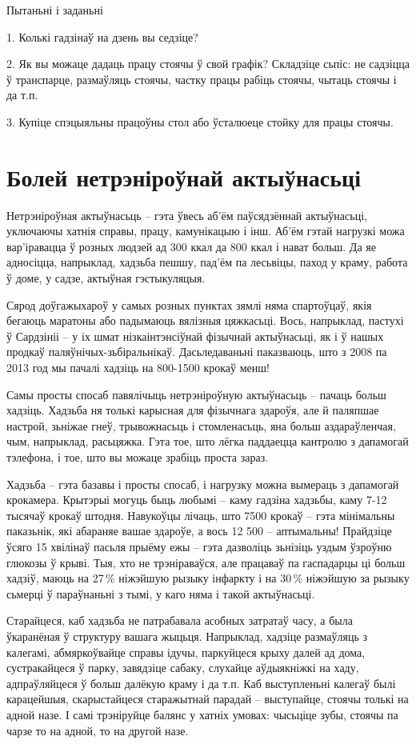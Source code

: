 Пытаньні і заданьні

1. Колькі гадзінаў на дзень вы седзіце?

2. Як вы можаце дадаць працу стоячы ў свой графік? Складзіце сьпіс: не садзіцца ў транспарце, размаўляць стоячы, частку працы рабіць стоячы, чытаць стоячы і да т.п.

3. Купіце спэцыяльны працоўны стол або ўсталюеце стойку для працы стоячы.


\section{Болей нетрэніроўнай актыўнасьці}

Нетрэніроўная актыўнасьць – гэта ўвесь аб'ём паўсядзённай актыўнасьці, уключаючы хатнія справы, працу, камунікацыю і інш. Аб'ём гэтай нагрузкі можа вар'іравацца ў розных людзей ад 300 ккал да 800 ккал і нават больш. Да яе адносіцца, напрыклад, хадзьба пешшу, пад'ём па лесьвіцы, паход у краму, работа ў доме, у садзе, актыўная гэстыкуляцыя.

Сярод доўгажыхароў у самых розных пунктах зямлі няма спартоўцаў, якія бегаюць маратоны або падымаюць вялізныя цяжкасьці. Вось, напрыклад, пастухі ў Сардзініі – у іх шмат нізкаінтэнсіўнай фізычнай актыўнасьці, як і ў нашых продкаў паляўнічых-зьбіральнікаў. Дасьледаваньні паказваюць, што з 2008 па 2013 год мы пачалі хадзіць на 800-1500 крокаў менш!

Самы просты спосаб павялічыць нетрэніроўную актыўнасьць – пачаць больш хадзіць. Хадзьба ня толькі карысная для фізычнага здароўя, але й паляпшае настрой, зьніжае гнеў, трывожнасьць і стомленасьць, яна больш аздараўленчая, чым, напрыклад, расьцяжка. Гэта тое, што лёгка паддаецца кантролю з дапамогай тэлефона, і тое, што вы можаце зрабіць проста зараз.

Хадзьба – гэта базавы і просты спосаб, і нагрузку можна вымераць з дапамогай крокамера. Крытэрыі могуць быць любымі – каму гадзіна хадзьбы, каму 7-12 тысячаў крокаў штодня. Навукоўцы лічаць, што 7500 крокаў – гэта мінімальны паказьнік, які абараняе вашае здароўе, а вось 12 500 – аптымальны! Прайдзіце ўсяго 15 хвілінаў пасьля прыёму ежы – гэта дазволіць зьнізіць уздым ўзроўню глюкозы ў крыві. Тыя, хто не трэніраваўся, але працаваў па гаспадарцы ці больш хадзіў, маюць на 27\,\% ніжэйшую рызыку інфаркту і на 30\,\% ніжэйшую за рызыку сьмерці ў параўнаньні з тымі, у каго няма і такой актыўнасьці.

Старайцеся, каб хадзьба не патрабавала асобных затратаў часу, а была ўкаранёная ў структуру вашага жыцьця. Напрыклад, хадзіце размаўляць з калегамі, абмяркоўвайце справы ідучы, паркуйцеся крыху далей ад дома, сустракайцеся ў парку, завядзіце сабаку, слухайце аўдыякніжкі на хаду, адпраўляйцеся ў больш далёкую краму і да т.п. Каб выступленьні калегаў былі карацейшыя, скарыстайцеся старажытнай парадай – выступайце, стоячы толькі на адной назе. І самі трэніруйце балянс у хатніх умовах: чысьціце зубы, стоячы па чарзе то на адной, то на другой назе.

